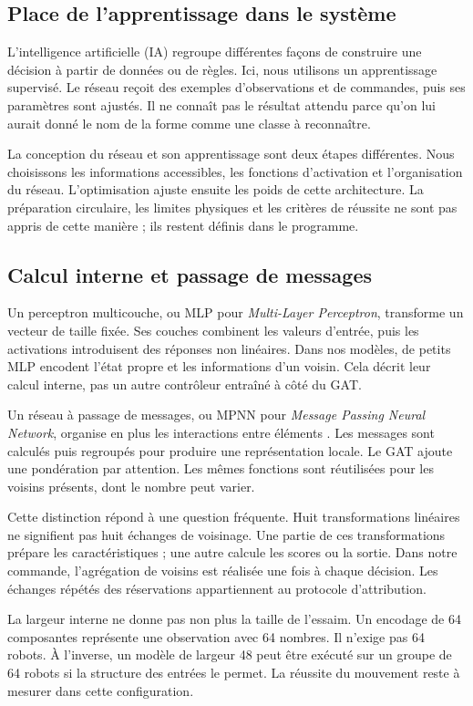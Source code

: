 \subsection{Place de l'apprentissage dans le système}
L'intelligence artificielle (IA) regroupe différentes façons de construire une décision à partir de données ou de règles. Ici, nous utilisons un apprentissage supervisé. Le réseau reçoit des exemples d'observations et de commandes, puis ses paramètres sont ajustés. Il ne connaît pas le résultat attendu parce qu'on lui aurait donné le nom de la forme comme une classe à reconnaître.

La conception du réseau et son apprentissage sont deux étapes différentes. Nous choisissons les informations accessibles, les fonctions d'activation et l'organisation du réseau. L'optimisation ajuste ensuite les poids de cette architecture. La préparation circulaire, les limites physiques et les critères de réussite ne sont pas appris de cette manière ; ils restent définis dans le programme.

\subsection{Calcul interne et passage de messages}
Un perceptron multicouche, ou MLP pour \textit{Multi-Layer Perceptron}, transforme un vecteur de taille fixée. Ses couches combinent les valeurs d'entrée, puis les activations introduisent des réponses non linéaires. Dans nos modèles, de petits MLP encodent l'état propre et les informations d'un voisin. Cela décrit leur calcul interne, pas un autre contrôleur entraîné à côté du GAT.

Un réseau à passage de messages, ou MPNN pour \textit{Message Passing Neural Network}, organise en plus les interactions entre éléments \cite{gilmer2017}. Les messages sont calculés puis regroupés pour produire une représentation locale. Le GAT ajoute une pondération par attention. Les mêmes fonctions sont réutilisées pour les voisins présents, dont le nombre peut varier.

Cette distinction répond à une question fréquente. Huit transformations linéaires ne signifient pas huit échanges de voisinage. Une partie de ces transformations prépare les caractéristiques ; une autre calcule les scores ou la sortie. Dans notre commande, l'agrégation de voisins est réalisée une fois à chaque décision. Les échanges répétés des réservations appartiennent au protocole d'attribution.

La largeur interne ne donne pas non plus la taille de l'essaim. Un encodage de 64 composantes représente une observation avec 64 nombres. Il n'exige pas 64 robots. À l'inverse, un modèle de largeur 48 peut être exécuté sur un groupe de 64 robots si la structure des entrées le permet. La réussite du mouvement reste à mesurer dans cette configuration.

